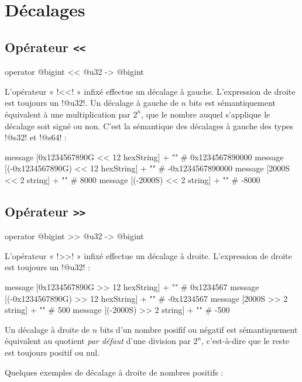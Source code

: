 \section{Décalages}

\subsection{Opérateur \texttt{<{}<}}

\begin{galgas4box}
operator @bigint << @u32 -> @bigint
\end{galgas4box}

L'opérateur « \ggsq!<<! » infixé effectue un décalage à gauche. L'expression de droite est toujours un \ggsq!@u32!. Un décalage à gauche de $n$ bits est sémantiquement équivalent à une multiplication par $2^n$, que le nombre auquel s'applique le décalage soit signé ou non. C'est la sémantique des décalages à gauche des types \ggsq!@s32! et \ggsq!@s64! :

\begin{galgas4}
message [0x1234567890G << 12 hexString] + "\n" # 0x1234567890000
message [(-0x1234567890G) << 12 hexString] + "\n" # -0x1234567890000
message [2000S << 2 string] + "\n" # 8000
message [(-2000S) << 2 string] + "\n" # -8000
\end{galgas4}

\subsection{Opérateur \texttt{>{}>}}

\begin{galgas4box}
operator @bigint >> @u32 -> @bigint
\end{galgas4box}

L'opérateur « \ggsq!>>! » infixé effectue un décalage à droite. L'expression de droite est toujours un \ggsq!@u32! :
\begin{galgas4}
message [0x1234567890G >> 12 hexString] + "\n" # 0x1234567
message [(-0x1234567890G) >> 12 hexString] + "\n" # -0x1234567
message [2000S >> 2 string] + "\n" # 500
message [(-2000S) >> 2 string] + "\n" # -500
\end{galgas4}

Un décalage à droite de $n$ bits d'un nombre posifif ou négatif est sémantiquement équivalent au quotient \emph{par défaut} d'une division par $2^n$, c'est-à-dire que le reste est toujours positif ou nul.

Quelques exemples de décalage à droite de nombres positifs :

